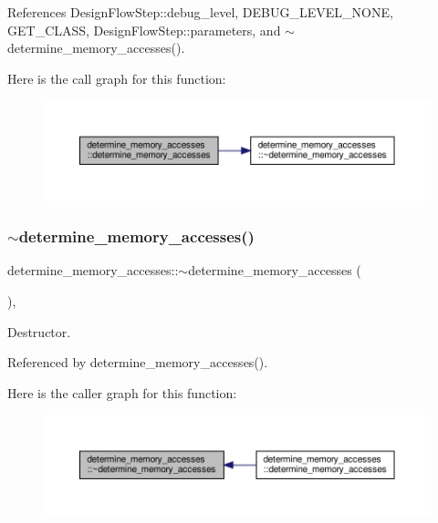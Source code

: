 References Design\+Flow\+Step\+::debug\+\_\+level, D\+E\+B\+U\+G\+\_\+\+L\+E\+V\+E\+L\+\_\+\+N\+O\+NE, G\+E\+T\+\_\+\+C\+L\+A\+SS, Design\+Flow\+Step\+::parameters, and $\sim$determine\+\_\+memory\+\_\+accesses().

Here is the call graph for this function\+:
\nopagebreak
\begin{figure}[H]
\begin{center}
\leavevmode
\includegraphics[width=350pt]{dd/d8a/classdetermine__memory__accesses_a379def7cb52f5a4b51961127aa859410_cgraph}
\end{center}
\end{figure}
\mbox{\label{classdetermine__memory__accesses_a9fcc117c8717ee2001a9bda537f7c010}} 
\subsubsection{\texorpdfstring{$\sim$determine\+\_\+memory\+\_\+accesses()}{~determine\_memory\_accesses()}}
{\footnotesize\ttfamily determine\+\_\+memory\+\_\+accesses\+::$\sim$determine\+\_\+memory\+\_\+accesses (\begin{DoxyParamCaption}{ }\end{DoxyParamCaption})\hspace{0.3cm}{\ttfamily [override]}, {\ttfamily [default]}}



Destructor. 



Referenced by determine\+\_\+memory\+\_\+accesses().

Here is the caller graph for this function\+:
\nopagebreak
\begin{figure}[H]
\begin{center}
\leavevmode
\includegraphics[width=350pt]{dd/d8a/classdetermine__memory__accesses_a9fcc117c8717ee2001a9bda537f7c010_icgraph}
\end{center}
\end{figure}


